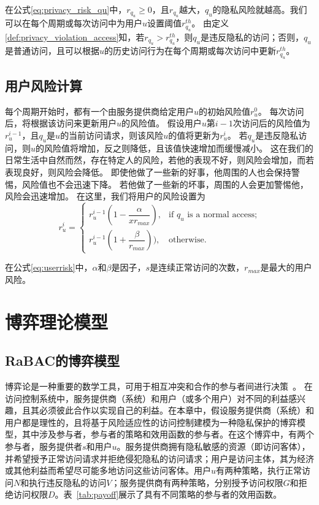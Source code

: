 在公式\ref{eq:privacy_risk_qu}中，$r_{q_u} \geq 0$，且$r_{q_u}$越大，$q_u$的隐私风险就越高。我们可以在每个周期或每次访问中为用户$u$设置阈值$r_{q_u}^{th}$。 由定义\ref{def:privacy_violation_access}知，若$r_{q_u} > r_{q_u}^{th}$，则$q_u$是违反隐私的访问；否则，$q_u$是普通访问，且可以根据$u$的历史访问行为在每个周期或每次访问中更新$r_{q_u}^{th}$。

\subsection{用户风险计算}

每个周期开始时，都有一个由服务提供商给定用户${u}$的初始风险值${r_u ^ 0}$。 每次访问后，将根据该访问来更新用户${u}$的风险值。 假设用户${u}$第${{i-1}}$次访问后的风险值为${r_u ^ {i-1}}$，且${q_u}$是${u}$的当前访问请求，则该风险$ {u}$的值将更新为${r_u ^ {i}}$。 若${q_u}$是违反隐私访问，则${u}$的风险值将增加，反之则降低，且该值快速增加而缓慢减小。 这在我们的日常生活中自然而然，存在特定人的风险，若他的表现不好，则风险会增加，而若表现良好，则风险会降低。 即使他做了一些新的好事，他周围的人也会保持警惕，风险值也不会迅速下降。 若他做了一些新的坏事，周围的人会更加警惕他，风险会迅速增加。 在这里，我们将用户的风险设置为
\begin{equation}\label{eq:userrisk}
r_u^{i}=\left\{ 
\begin{array}{cl}
r_u^{i-1}(1-\dfrac{\alpha}{xr_{max}}), & \text{if } q_u \text{ is a normal access;}\\
r_u^{i-1}(1+\dfrac{\beta}{r_{max}})), & \text{otherwise.}
\end{array}
\right.
\end{equation}

在公式\ref{eq:userrisk}中，$\alpha$和$\beta$是因子，$s$是连续正常访问的次数，$r_{max}$是最大的用户风险。

\section{博弈理论模型}
\label{sec:gamemodel}

\subsection{RaBAC的博弈模型}

博弈论是一种重要的数学工具，可用于相互冲突和合作的参与者间进行决策~\cite{owen2001}。
在访问控制系统中，服务提供商（系统）和用户（或多个用户）对不同的利益感兴趣，且其必须彼此合作以实现自己的利益。在本章中，假设服务提供商（系统）和用户都是理性的，且将基于风险适应性的访问控制建模为一种隐私保护的博弈模型，其中涉及参与者，参与者的策略和效用函数的参与者。在这个博弈中，有两个参与者，服务提供者$s$和用户$u$。服务提供商拥有隐私敏感的资源（即访问客体），并希望授予正常访问请求并拒绝侵犯隐私的访问请求；用户是访问主体，其为经济或其他利益而希望尽可能多地访问这些访问客体。用户$u$有两种策略，执行正常访问$N$和执行违反隐私的访问$V$；服务提供商有两种策略，分别授予访问权限$G$和拒绝访问权限$D$。表~\ref{tab:payoff}展示了具有不同策略的参与者的效用函数。

